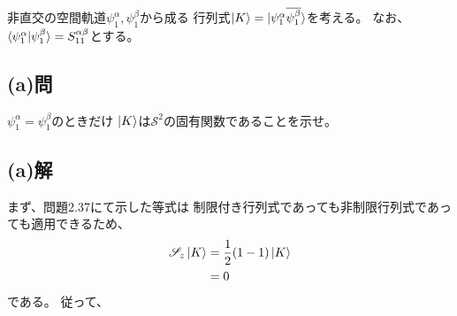 非直交の空間軌道$\psi_1^{\alpha}, \psi_1^{\beta}$から成る
行列式$\ket{K}=\ket{{\psi_1^{\alpha}}{\overline{\psi_1^{\beta}}}}$を考える。
なお、$\braket{\psi_1^{\alpha}|\psi_1^{\beta}}=S_{11}^{\alpha\beta}$とする。
\subsection{(a)問}
$\psi_1^{\alpha}=\psi_1^{\beta}$のときだけ
$\ket{K}$は$\mathscr{S}^2$の固有関数であることを示せ。


\subsection{(a)解}
まず、問題2.37にて示した等式は
制限付き行列式であっても非制限行列式であっても適用できるため、
\begin{align}
	\mathscr{S}_z \ket{K}
&=
	\frac{1}{2}(1-1) \ket{K} \\
%
%
&=
	0
\end{align}
である。
従って、
